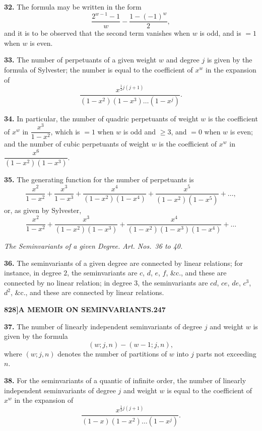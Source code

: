 \documentclass[12pt,a4paper]{article}
\theoremstyle{definition}
\begin{document}
\noindent\textbf{32.} The formula may be written in the form
\[
\frac{2^{w-1} - 1}{w} - \frac{1 - (-1)^w}{2},
\]
and it is to be observed that the second term vanishes when $w$ is odd, and is $= 1$ when $w$ is even.

\noindent\textbf{33.} The number of perpetuants of a given weight $w$ and degree $j$ is given by the formula of Sylvester; the number is equal to the coefficient of $x^w$ in the expansion of
\[
\frac{x^{\frac{1}{2}j(j+1)}}{(1-x^2)(1-x^3)\dots(1-x^j)}.
\]

\noindent\textbf{34.} In particular, the number of quadric perpetuants of weight $w$ is the coefficient of $x^w$ in $\dfrac{x^3}{1-x^2}$, which is $= 1$ when $w$ is odd and $\geq 3$, and $= 0$ when $w$ is even; and the number of cubic perpetuants of weight $w$ is the coefficient of $x^w$ in $\dfrac{x^6}{(1-x^2)(1-x^3)}$.

\noindent\textbf{35.} The generating function for the number of perpetuants is
\[
\frac{x^2}{1-x^2} + \frac{x^3}{1-x^3} + \frac{x^4}{(1-x^2)(1-x^4)} + \frac{x^5}{(1-x^2)(1-x^5)} + \dots,
\]
or, as given by Sylvester,
\[
\frac{x^2}{1-x^2} + \frac{x^3}{(1-x^2)(1-x^3)} + \frac{x^4}{(1-x^2)(1-x^3)(1-x^4)} + \dots
\]

\begin{center}
\textit{The Seminvariants of a given Degree. Art. Nos.~36 to 40.}
\end{center}

\noindent\textbf{36.} The seminvariants of a given degree are connected by linear relations; for instance, in degree $2$, the seminvariants are $c$, $d$, $e$, $f$, \&c., and these are connected by no linear relation; in degree $3$, the seminvariants are $cd$, $ce$, $de$, $c^3$, $d^2$, \&c., and these are connected by linear relations.

\newpage
\setcounter{page}{247}

\noindent\textbf{828]}\hfill\textbf{A MEMOIR ON SEMINVARIANTS.}\hfill\textbf{247}

\bigskip

\noindent\textbf{37.} The number of linearly independent seminvariants of degree $j$ and weight $w$ is given by the formula
\[
(w; j, n) - (w-1; j, n),
\]
where $(w; j, n)$ denotes the number of partitions of $w$ into $j$ parts not exceeding $n$.

\noindent\textbf{38.} For the seminvariants of a quantic of infinite order, the number of linearly independent seminvariants of degree $j$ and weight $w$ is equal to the coefficient of $x^w$ in the expansion of
\[
\frac{x^{\frac{1}{2}j(j+1)}}{(1-x)(1-x^2)\dots(1-x^j)}.
\]
\end{document}
